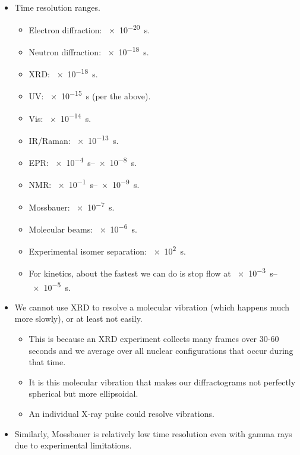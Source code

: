 \documentclass[../notes.tex]{subfiles}
\begin{document}
\begin{itemize}
\begin{equation*}
    \end{equation*}
    \begin{itemize}
        \item A molecule vibrates on this order, so that's why UV/Vis is pretty good at resolving molecular vibrations.
    \end{itemize}
    \item Time resolution ranges.
    \begin{itemize}
        \item Electron diffraction: \SI{e-20}{\second}.
        \item Neutron diffraction: \SI{e-18}{\second}.
        \item XRD: \SI{e-18}{\second}.
        \item UV: \SI{e-15}{\second} (per the above).
        \item Vis: \SI{e-14}{\second}.
        \item IR/Raman: \SI{e-13}{\second}.
        \item EPR: \SIrange{e-4}{e-8}{\second}.
        \item NMR: \SIrange{e-1}{e-9}{\second}.
        \item Mossbauer: \SI{e-7}{\second}.
        \item Molecular beams: \SI{e-6}{\second}.
        \item Experimental isomer separation: \SI{e2}{\second}.
        \item For kinetics, about the fastest we can do is stop flow at \SIrange{e-3}{e-5}{\second}.
    \end{itemize}
    \item We cannot use XRD to resolve a molecular vibration (which happens much more slowly), or at least not easily.
    \begin{itemize}
        \item This is because an XRD experiment collects many frames over 30-60 seconds and we average over all nuclear configurations that occur during that time.
        \item It is this molecular vibration that makes our diffractograms not perfectly spherical but more ellipsoidal.
        \item An individual X-ray pulse could resolve vibrations.
    \end{itemize}
    \item Similarly, Mossbauer is relatively low time resolution even with gamma rays due to experimental limitations.
    \begin{itemize}

\end{itemize}
\end{itemize}
\end{document}
